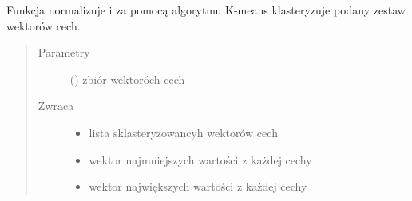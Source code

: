\documentclass[letterpaper,10pt,polish]{sphinxmanual}
\begin{document}
\begin{fulllineitems}
\label{\detokenize{hmm_main:hmm_main.hmm_claster}}
Funkcja normalizuje i za pomocą algorytmu K-means klasteryzuje podany zestaw wektorów cech.
\begin{quote}\begin{description}
\item[{Parametry}] \leavevmode
{} (\sphinxstyleliteralemphasis{{[}}\sphinxstyleliteralemphasis{{]}}) \textendash{} zbiór wektoróch cech

\item[{Zwraca}] \leavevmode
\begin{itemize}
\item {} 
lista sklasteryzowancyh wektorów cech

\item {} 
wektor najmniejszych wartości z każdej cechy

\item {} 
wektor największych wartości z każdej cechy

\end{itemize}


\end{description}\end{quote}

\end{fulllineitems}

\end{document}
